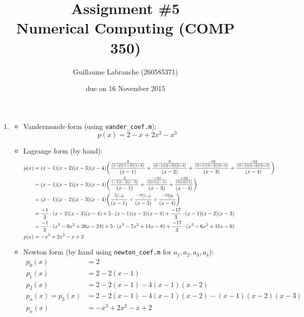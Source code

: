 \documentclass{article}
\author{Guillaume Labranche (260585371)}
\title{Assignment \#5\\Numerical Computing (COMP 350)}
\date{due on 16 November 2015}
\begin{document}
\maketitle

\begin{enumerate}
\item 
\begin{itemize}
\item Vandermonde form (using \texttt{vander\_coef.m}): \begin{equation*}
p(x) = 2 - x + 2x^2 - x^3
\end{equation*}

\item Lagrange form (by hand):\begin{align*}
p(x) &= (x-1)(x-2)(x-3)(x-4)\bigg(
\frac{\frac{2}{(1-2)(1-3)(1-4)}}{(x-1)} +
\frac{\frac{0}{(2-1)(2-3)(2-4)}}{(x-2)} +
\frac{\frac{-10}{(3-1)(3-2)(3-4)}}{(x-3)} +
\frac{\frac{-34}{(4-1)(4-2)(4-3)}}{(x-4)}
\bigg)
\\ &= (x-1)(x-2)(x-3)(x-4)\bigg(
\frac{\frac{2}{(-1)(-2)(-3)}}{(x-1)} +
\frac{\frac{-10}{(2)(1)(-1)}}{(x-3)} +
\frac{\frac{-34}{(3)(2)(1)}}{(x-4)}
\bigg)
\\ &= (x-1)(x-2)(x-3)(x-4)\bigg(
\frac{\sfrac{2}{{-6}}}{(x-1)} +
\frac{\sfrac{{-10}}{{-2}}}{(x-3)} +
\frac{\sfrac{{-34}}{6}}{(x-4)}
\bigg)
\\ &=
\frac{-1}{{3}}\cdot (x-2)(x-3)(x-4) +
5 \cdot (x-1)(x-2)(x-4) +
\frac{{-17}}{3}\cdot (x-1)(x-2)(x-3)
\\ &=
\frac{-1}{{3}}\cdot (x^3-9 x^2+26 x-24) +
5 \cdot (x^3-7 x^2+14 x-8) +
\frac{{-17}}{3}\cdot (x^3-6 x^2+11 x-6)
\\ p(x) &= -x^3+2 x^2-x+2
\end{align*}

\item Newton form (by hand using \texttt{newton\_coef.m} for $a_1,a_2,a_3,a_4$):\begin{align*}
p_0(x) &= 2 \\
p_1(x) &= 2 -2(x-1) \\
p_2(x) &= 2 -2(x-1) - 4(x-1)(x-2) \\
p_n(x) = p_3(x) &= 2 -2(x-1) - 4(x-1)(x-2) - (x-1)(x-2)(x-3) \\
p_n(x) &= -x^3+2 x^2-x+2
\end{align*}
\end{itemize}


\end{enumerate}
\end{document}
